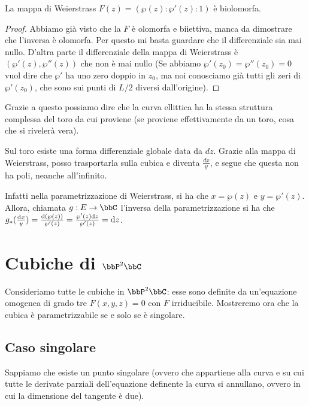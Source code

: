   \begin{proposizione}
      La mappa di Weierstrass $F(z)=(\wp(z) : \wp'(z) : 1)$ è biolomorfa.
  \end{proposizione}
  \begin{proof}
      Abbiamo già visto che la $F$ è olomorfa e biiettiva, manca da dimostrare che l'inversa è olomorfa.
      Per questo mi basta guardare che il differenziale sia mai nullo. D'altra parte il differenziale della mappa di Weierstrass è $ (\wp'(z), \wp''(z))$ che non è mai nullo (Se abbiamo $\wp'(z_0) = \wp''(z_0) = 0$ vuol dire che $\wp'$ ha uno zero doppio in $z_0$, ma noi conosciamo già tutti gli zeri di $\wp'(z_0)$, che sono sui punti di $L/2$ diversi dall'origine).
  \end{proof}

  Grazie a questo possiamo dire che la curva ellittica ha la stessa struttura complessa del toro da cui proviene (se proviene effettivamente da un toro, cosa che si rivelerà vera).

  \begin{osservazione}
      Sul toro esiste una forma differenziale globale data da $dz$. Grazie alla mappa di Weierstrass, posso trasportarla sulla cubica e diventa $\frac{dx}y$, e segue che questa non ha poli, neanche all'infinito.

      Infatti nella parametrizzazione di Weierstrass, si ha che $x = \wp(z)$ e $y = \wp'(z)$. Allora, chiamata $g: E \rar \bbC$ l'inversa della parametrizzazione si ha che $g_*(\frac{\text{d} x}{y}) = \frac{\text{d}(\wp(z))}{\wp'(z)} = \frac{\wp'(z) \text{d} z}{\wp'(z)} = \text{d} z$.

  \end{osservazione}

\section{Cubiche di $\bbP^2\bbC$}
Consideriamo tutte le cubiche in $\bbP^2\bbC$: esse sono definite da
un'equazione omogenea di grado tre $F(x, y, z) = 0$ con $F$
irriducibile. Mostreremo ora che la cubica è parametrizzabile se e solo
se è singolare.


\subsection{Caso singolare}
Sappiamo che esiste un punto singolare (ovvero che appartiene alla curva
e su cui tutte le derivate parziali dell'equazione definente la curva si
annullano, ovvero in cui la dimensione del tangente è due).

